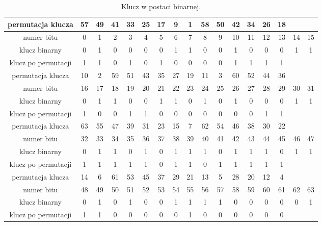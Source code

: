 \documentclass[12p]{article}
\begin{document}
\begin{table}[!h]
\centering
\begin{tabular}{|c|c|c|c|c|c|c|c|c|c|c|c|c|c|c|c|c|}
\hline
permutacja klucza & 57 & 49 & 41 & 33 & 25 & 17 & 9 & 1 & 58 & 50 & 42 & 34 & 26 & 18 & &\\
\hline
numer bitu & 0 & 1 & 2 & 3 & 4 & 5 & 6 & 7 & 8 & 9 & 10 & 11 & 12 & 13 & 14 & 15\\
\hline
klucz binarny & 0 & 1 & 0 & 0 & 0 & 0 & 1 & 1 & 0 & 0 & 1 & 0 & 0 & 0 & 1 & 1\\
\hline
klucz po permutacji & 1 & 1 & 0 & 1 & 0 & 1 & 0 & 0 & 0 & 0 & 1 & 1 & 1 & 1 &&\\

\hline
\hline
permutacja klucza & 10 & 2 & 59 & 51 & 43 & 35 & 27 & 19 & 11 & 3 & 60 & 52 & 44 & 36 &&\\
\hline
numer bitu & 16 & 17 & 18 & 19 & 20 & 21 & 22 & 23 & 24 & 25 & 26 & 27 & 28 & 29 & 30 & 31\\
\hline
klucz binarny & 0 & 1 & 1 & 0 & 0 & 1 & 1 & 0 & 1 & 0 & 1 & 0 & 0 & 0 & 1 & 1\\
\hline 
klucz po permutacji & 1 & 0 & 0 & 1 & 1 & 0 & 0 & 0 & 0 & 0 & 0 & 0 & 1 & 1 &&\\

\hline
\hline
permutacja klucza & 63 & 55 & 47 & 39 & 31 & 23 & 15 & 7 & 62 & 54 & 46 & 38 & 30 & 22 &&\\
\hline
numer bitu & 32 & 33 & 34 & 35 & 36 & 37 & 38 & 39 & 40 & 41 & 42 & 43 & 44 & 45 & 46 & 47 \\
\hline
klucz binarny & 0 & 1 & 1 & 0 & 1 & 0 & 1 & 1 & 1 & 0 & 1 & 1 & 1 & 0 & 1 & 1 \\
\hline
klucz po permutacji & 1 & 1 & 1 & 1 & 1 & 0 & 1 & 1 & 0 & 1 & 1 & 1 & 1 & 1 &&\\

\hline
\hline
permutacja klucza & 14 & 6 & 61 & 53 & 45 & 37 & 29 & 21 & 13 & 5 & 28 & 20 & 12 & 4 &&\\
\hline
numer bitu & 48 & 49 & 50 & 51 & 52 & 53 & 54 & 55 & 56 & 57 & 58 & 59 & 60 & 61 & 62 & 63\\
\hline
klucz binarny & 0 & 1 & 0 & 1 & 0 & 0 & 1 & 1 & 1 & 1 & 0 & 0 & 0 & 0 & 0 & 1\\
\hline 
klucz po permutacji & 1 & 1 & 0 & 0 & 0 & 0 & 0 & 1 & 0 & 0 & 0 & 0 & 0 & 0 &&\\
\hline
\end{tabular}
\caption{Klucz w postaci binarnej.}~\label{tabela_podstawienia}
\end{table}
\end{document}
